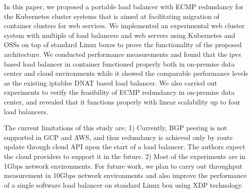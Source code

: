 In this paper, we proposed a portable load balancer with ECMP redundancy for the Kubernetes cluster systems that is aimed at facilitating migration of container clusters for web services.
We implemented an experimental web cluster system with multiple of load balancers and web servers using Kubernetes and OSSs on top of standard Linux boxes to prove the functionality of the proposed architecture.
We conducted performance measurements and found that the ipvs based load balancer in container functioned properly both in on-premise data center and cloud environments while it showed the comparable performance levels as the existing iptables DNAT based load balancer.
We also carried out experiments to verify the feasibility of ECMP redundancy in on-premise data center, and revealed that it functions properly with linear scalability up to four load balancers.

The current limitations of this study are;
1) Currently, BGP peering is not supported in GCP and AWS, and thus redundancy is achieved only by route update through cloud API upon the start of a load balancer.
The authors expect the cloud providers to support it in the future.
2) Most of the experiments are in 1Gbps network environments.
For future work, we plan to carry out throughput measurement in 10Gbps network environments and also improve the performance of a single software load balancer on standard Linux box using XDP technology.
